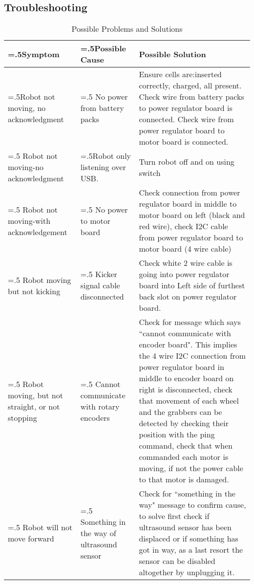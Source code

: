 \subsection{Troubleshooting}
\begin{table}[H]
\begin{tabularx}{\textwidth}{ >{\hsize=.5\hsize}X >{\hsize=.5\hsize}X X }
\toprule
\textbf{Symptom} &\textbf{Possible Cause} &\textbf{Possible Solution} \\
\midrule
Robot not moving, no acknowledgment & No power from battery packs & Ensure cells are:inserted correctly, charged, all present. Check wire from battery packs to power regulator board is connected. Check wire from power regulator board to motor board is connected.
\\
\midrule
Robot not moving-no acknowledgment     &Robot only listening over USB. & Turn robot off and on using switch 
\\
\midrule
Robot not moving-with acknowledgement  & No power to motor board  & Check connection from power regulator board in middle to motor board on left (black and red wire), check I2C cable from power regulator board to motor board (4 wire cable)
\\
\midrule
Robot moving but not kicking  & Kicker signal cable disconnected & Check white 2 wire cable is going into power regulator board into  Left side of furthest back slot on power regulator board. 
\\
\midrule
Robot moving, but not straight, or not stopping & Cannot communicate with rotary encoders& Check for message which says ``cannot communicate with encoder board". This implies the 4 wire I2C connection from power regulator board in middle to encoder board on right is disconnected, check that movement of each wheel and the grabbers can be detected by checking their position with the ping command, check that when commanded each motor is moving, if not the power cable to that motor is damaged.
\\
\midrule
Robot will not move forward & Something in the way of ultrasound sensor & Check for ``something in the way" message to confirm cause, to solve first check if ultrasound sensor has been displaced or if something has got in way, as a last resort the sensor can be disabled altogether by unplugging it.
\\ 
\bottomrule
\end{tabularx}
\caption{Possible Problems and Solutions}
\end{table}